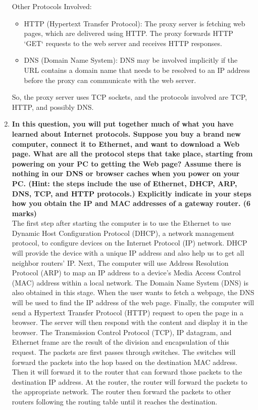 \documentclass[11pt]{article}
\begin{document}
\begin{enumerate}
		Other Protocols Involved:
		
			\begin{itemize}
				\item HTTP (Hypertext Transfer Protocol): The proxy server is fetching web pages, which are delivered using HTTP. The proxy forwards HTTP `GET` requests to the web server and receives HTTP responses.
				\item DNS (Domain Name System): DNS may be involved implicitly if the URL contains a domain name that needs to be resolved to an IP address before the proxy can communicate with the web server.
			\end{itemize}
		So, the proxy server uses TCP sockets, and the protocols involved are TCP, HTTP, and possibly DNS.
		
		\item \textbf{In this question, you will put together much of what you have learned about Internet protocols. Suppose you buy a brand new computer, connect it to Ethernet, and want to download a Web page. What are all the protocol steps that take place, starting from powering on your PC to getting the Web page? Assume there is nothing in our DNS or browser caches when you power on your PC. (Hint: the steps include the use of Ethernet, DHCP, ARP, DNS, TCP, and HTTP protocols.) Explicitly indicate in your steps how you obtain the IP and MAC addresses of a gateway router. (6 marks)}\\
		
		The first step after starting the computer is to use the Ethernet to use Dynamic Host Configuration Protocol (DHCP), a network management protocol, to configure devices on the Internet Protocol (IP) network. DHCP will provide the device with a unique IP address and also help us to get all neighbor routers' IP. Next, The computer will use Address Resolution Protocol (ARP) to map an IP address to a device's Media Access Control (MAC) address within a local network. The Domain Name System (DNS) is also obtained in this stage. When the user wants to fetch a webpage, the DNS will be used to find the IP address of the web page. Finally, the computer will send a Hypertext Transfer Protocol (HTTP) request to open the page in a browser. The server will then respond with the content and display it in the browser. The Transmission Control Protocol (TCP), IP datagram, and Ethernet frame are the result of the division and encapsulation of this request. The packets are first passes through switches. The switches will forward the packets into the hop based on the destination MAC address. Then it will forward it to the router that can forward those packets to the destination IP address. At the router, the router will forward the packets to the appropriate network. The router then forward the packets to other routers following the routing table until it reaches the destination.\\
	\end{enumerate}
\end{document}
